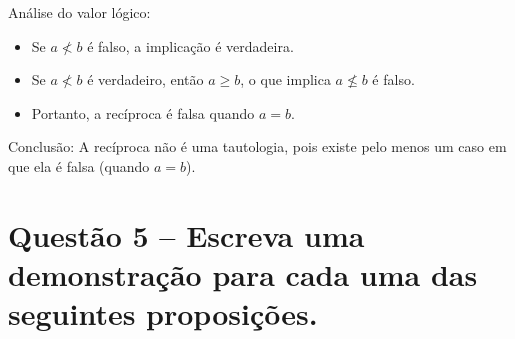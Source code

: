 \documentclass[12pt,a4paper]{article}
\begin{document}
\begin{enumerate}[label= (\alph*)]
        Análise do valor lógico:
        \begin{itemize}
            \item Se \( a \nless b \) é falso, a implicação é verdadeira.
            \item Se \( a \nless b \) é verdadeiro, então \( a \geq b \), o que implica \( a \nleq b \) é falso.
            \item Portanto, a recíproca é falsa quando \( a = b \).
        \end{itemize}
        
        Conclusão: A recíproca não é uma tautologia, pois existe pelo menos um caso em que ela é falsa (quando \( a = b \)).
    \end{enumerate}

\section*{Questão 5 -- Escreva uma demonstração para cada uma das seguintes proposições.}
\end{document}
